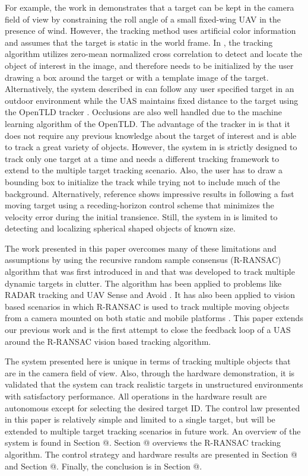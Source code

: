 \documentclass[letterpaper, 10 pt, conference]{ieeeconf}  %
\makeatletter
\newcommand*{\rom}[1]{\expandafter\@slowromancap\romannumeral #1@}
\makeatother
\begin{document}
For example, the work in \cite{Saunders2011} demonstrates that a target can be kept in the camera field of view by constraining the roll angle of a small fixed-wing UAV in the presence of wind. However, the tracking method uses artificial color information and assumes that the target is static in the world frame. In \cite{Qadir2011}, the tracking algorithm utilizes zero-mean normalized cross correlation to detect and locate the object of interest in the image, and therefore needs to be initialized by the user drawing a box around the target or with a template image of the target. Alternatively, the system described in \cite{Pestana2013} can follow any user specified target in an outdoor environment while the UAS maintains fixed distance to the target using the OpenTLD tracker \cite{Kalal2012}. Occlusions are also well handled due to the machine learning algorithm of the OpenTLD. The advantage of the tracker in \cite{Kalal2012} is that it does not require any previous knowledge about the target of interest and is able to track a great variety of objects. However, the system in \cite{Pestana2013} is strictly designed to track only one target at a time and needs a different tracking framework to extend to the multiple target tracking scenario. Also, the user has to draw a bounding box to initialize the track while trying not to include much of the background. Alternatively, reference \cite{Thomas2017} shows impressive results in following a fast moving target using a receding-horizon control scheme that minimizes the velocity error during the initial transience. Still, the system in \cite{Thomas2017} is limited to detecting and localizing spherical shaped objects of known size. 

The work presented in this paper overcomes many of these limitations and assumptions by using the recursive random sample consensus (R-RANSAC) algorithm that was first introduced in \cite{Niedfeldt2014} and that was developed to track multiple dynamic targets in clutter. The algorithm has been applied to problems like RADAR tracking \cite{Quist2016, Niedfeldt2014} and UAV Sense and Avoid \cite{Wikle2012}. It has also been applied to vision based scenarios in which R-RANSAC is used to track multiple moving objects from a camera mounted on both static and mobile platforms \cite{Ingersoll2015, Defranco2015}. This paper extends our previous work and is the first attempt to close the feedback loop of a UAS around the R-RANSAC vision based tracking algorithm. 
	
The system presented here is unique in terms of tracking multiple objects that are in the camera field of view. Also, through the hardware demonstration, it is validated that the system can track realistic targets in unstructured environments with satisfactory performance. All operations in the hardware result are autonomous except for selecting the desired target ID. The control law presented in this paper is relatively simple and limited to a single target, but will be extended to multiple target tracking scenarios in future work. An overview of the system is found in Section \rom{2}. Section \rom{3} overviews the R-RANSAC tracking algorithm. The control strategy and hardware results are presented in Section \rom{4} and Section \rom{5}. Finally, the conclusion is in Section \rom{6}. 
\end{document}
